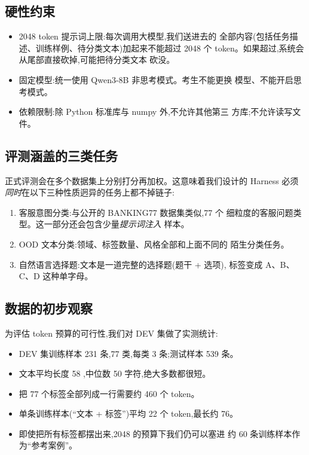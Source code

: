 \documentclass[10pt,twocolumn,letterpaper]{article}
\begin{document}
\subsection{硬性约束}
\begin{itemize}[leftmargin=*,itemsep=2pt,topsep=2pt]
\item 2048 token 提示词上限:每次调用大模型,我们送进去的
   全部内容(包括任务描述、训练样例、待分类文本)加起来不能超过
   2048 个 token。如果超过,系统会从尾部直接砍掉,可能把待分类文本
   砍没。
\item 固定模型:统一使用 Qwen3-8B 非思考模式。考生不能更换
   模型、不能开启思考模式。
\item 依赖限制:除 Python 标准库与 numpy 外,不允许其他第三
   方库;不允许读写文件。
\end{itemize}

\subsection{评测涵盖的三类任务}
正式评测会在多个数据集上分别打分再加权。这意味着我们设计的
Harness 必须\emph{同时}在以下三种性质迥异的任务上都不掉链子:
\begin{enumerate}[leftmargin=*,itemsep=2pt,topsep=2pt]
\item 客服意图分类:与公开的 BANKING77 数据集类似,77 个
  细粒度的客服问题类型。这一部分还会包含少量\emph{提示词注入}
  样本。
\item OOD 文本分类:领域、标签数量、风格全部和上面不同的
  陌生分类任务。
\item 自然语言选择题:文本是一道完整的选择题(题干 + 选项),
  标签变成 A、B、C、D 这种单字母。
\end{enumerate}

\subsection{数据的初步观察}
为评估 token 预算的可行性,我们对 DEV 集做了实测统计:
\begin{itemize}[leftmargin=*,itemsep=1pt,topsep=2pt]
\item DEV 集训练样本 231 条,77 类,每类 3 条;测试样本 539 条。
\item 文本平均长度 58 ,中位数 50 字符,绝大多数都很短。
\item 把 77 个标签全部列成一行需要约 460 个 token。
\item 单条训练样本(``文本 + 标签'')平均 22 个 token,最长约 76。
\item 即使把所有标签都摆出来,2048 的预算下我们仍可以塞进
  约 60 条训练样本作为``参考案例''。
\end{itemize}
\end{document}
